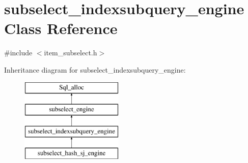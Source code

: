 \hypertarget{classsubselect__indexsubquery__engine}{}\section{subselect\+\_\+indexsubquery\+\_\+engine Class Reference}
\label{classsubselect__indexsubquery__engine}


{\ttfamily \#include $<$item\+\_\+subselect.\+h$>$}

Inheritance diagram for subselect\+\_\+indexsubquery\+\_\+engine\+:\begin{figure}[H]
\begin{center}
\leavevmode
\includegraphics[height=4.000000cm]{classsubselect__indexsubquery__engine}
\end{center}
\end{figure}
